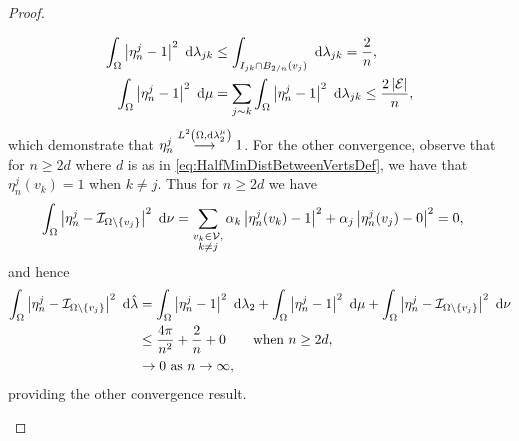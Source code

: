 \begin{proof}
\begin{enumerate}[(i)]
\begin{align*}
			\int_{\Omega}\left\lvert  \eta_n^j - 1  \right\rvert^2 \ \mathrm{d}\lambda_{jk}
			&\leq \int_{I_{jk} \cap B_{2/n}(v_j)} \ \mathrm{d}\lambda_{jk} = \frac{2}{n}, \\
			\int_{\Omega}\left\lvert  \eta_n^j - 1  \right\rvert^2 \ \mathrm{d}\mu
			&= \sum_{j\sim k} \int_{\Omega}\left\lvert  \eta_n^j - 1  \right\rvert^2 \ \mathrm{d}\lambda_{jk} \leq \frac{2\left\lvert \mathcal{E} \right\rvert}{n},
		\end{align*}
		which demonstrate that $\eta_n^j \overset{L^{2}\left( \Omega,\mathrm{d} \lambda_2^{\mu} \right)}{\longrightarrow} 1$.
		For the other convergence, observe that for $n \geq 2d$ where $d$ is as in \eqref{eq:HalfMinDistBetweenVertsDef}, we have that $\eta_n^j(v_k) = 1$ when $k\neq j$.
		Thus for $n \geq 2d$ we have
		\begin{align*}
			\int_{\Omega}\left\lvert  \eta_n^j - \mathcal{I}_{\Omega\setminus\left\{ v_j \right\}}  \right\rvert^2 \ \mathrm{d}\nu
			&= \sum_{\substack{v_k\in\mathcal{V}, \\ k\neq j}}\alpha_k\left\lvert \eta_n^j(v_k) - 1 \right\rvert^2
			+ \alpha_j\left\lvert  \eta_n^j(v_j) - 0  \right\rvert^2
			= 0,
		\end{align*}
		and hence
		\begin{align*}
			\int_{\Omega}\left\lvert  \eta_n^j - \mathcal{I}_{\Omega\setminus\left\{ v_j \right\}}  \right\rvert^2 \ \mathrm{d}\hat{\lambda}
			&= \int_{\Omega}\left\lvert  \eta_n^j - 1  \right\rvert^2 \ \mathrm{d}\lambda_2
			+ \int_{\Omega}\left\lvert  \eta_n^j - 1  \right\rvert^2 \ \mathrm{d}\mu
			+ \int_{\Omega}\left\lvert  \eta_n^j - \mathcal{I}_{\Omega\setminus\left\{ v_j \right\}}  \right\rvert^2 \ \mathrm{d}\nu \\
			&\leq \frac{4\pi}{n^2} + \frac{2}{n} + 0 \qquad\text{when } n\geq 2d, \\
			&\rightarrow 0 \ \text{as} \ n \rightarrow\infty,
		\end{align*}
		providing the other convergence result.
	\end{enumerate}
\end{proof}

